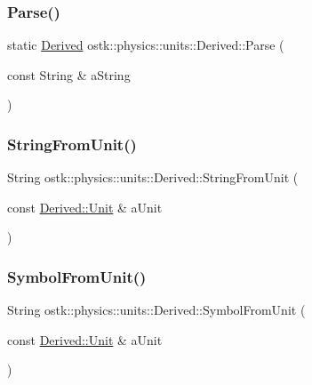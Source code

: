 \subsubsection{\texorpdfstring{Parse()}{Parse()}}
{\footnotesize\ttfamily static \hyperlink{classostk_1_1physics_1_1units_1_1_derived}{Derived} ostk\+::physics\+::units\+::\+Derived\+::\+Parse (\begin{DoxyParamCaption}\item[{const String \&}]{a\+String }\end{DoxyParamCaption})\hspace{0.3cm}{\ttfamily [static]}}

\mbox{\label{classostk_1_1physics_1_1units_1_1_derived_aaa187a7a568772d01109028aca4cd1a1}} 
\subsubsection{\texorpdfstring{String\+From\+Unit()}{StringFromUnit()}}
{\footnotesize\ttfamily String ostk\+::physics\+::units\+::\+Derived\+::\+String\+From\+Unit (\begin{DoxyParamCaption}\item[{const \hyperlink{classostk_1_1physics_1_1units_1_1_derived_1_1_unit}{Derived\+::\+Unit} \&}]{a\+Unit }\end{DoxyParamCaption})\hspace{0.3cm}{\ttfamily [static]}}

\mbox{\label{classostk_1_1physics_1_1units_1_1_derived_afd7f7eb95f1de5ca792b587ece5ad3c0}} 
\subsubsection{\texorpdfstring{Symbol\+From\+Unit()}{SymbolFromUnit()}}
{\footnotesize\ttfamily String ostk\+::physics\+::units\+::\+Derived\+::\+Symbol\+From\+Unit (\begin{DoxyParamCaption}\item[{const \hyperlink{classostk_1_1physics_1_1units_1_1_derived_1_1_unit}{Derived\+::\+Unit} \&}]{a\+Unit }\end{DoxyParamCaption})\hspace{0.3cm}{\ttfamily [static]}}

